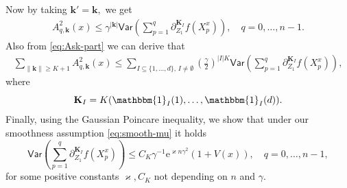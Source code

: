 \documentclass[bj]{imsart}
\def\PVar{\mathsf{Var}}
\def\rme{\mathrm{e}}
\newcommand{\indi}[1]{\mathbbm{1}_{#1}}
\begin{document}
Now by taking $\mathbf{k}'=\mathbf{k},$ we get
\begin{eqnarray*}
A^2_{q,\mathbf{k}}(x)\leq \gamma^{|\mathbf{k}|} \PVar \left( \sum_{p=1}^{q}\partial_{Z_{1}}^{\mathbf{K}_I}f\left(X_{p}^x\right)
\right),\quad q=0,\ldots,n-1.
\end{eqnarray*}
Also from \eqref{eq:Ask-part} we can derive that
\begin{eqnarray*}
\sum_{\|\mathbf{k}\|\geq K+1} A^2_{q,\mathbf{k}}(x)\leq \sum_{I\subseteq\{1,\ldots,d\},\, I\neq \emptyset}
\left(\frac{\gamma}{2}\right)^{|I|K}
\PVar \left( \sum_{p=1}^{q}\partial_{Z_{1}}^{\mathbf{K}_I}f\left(X_{p}^x\right)
\right),
\end{eqnarray*}
where
\[
\mathbf{\mathbf{K}}_{I}=K(\indi{I}(1),\ldots, \indi{I}(d)).
\]
Finally, using the Gaussian Poincare inequality, we show  that under our smoothness assumption \eqref{eq:smooth-mu} it holds
\begin{equation}
\label{eq:varboundV}
\PVar \left(\sum_{p=1}^{q}\partial_{Z_{1}}^{\mathbf{K}_I}f\left(X^x_{p}\right)
\right)\leq C_{K}\gamma^{-1}\rme^{\varkappa n\gamma^2}(1+V(x)),\quad q=0,\ldots,n-1,
\end{equation}
for some positive constants $\varkappa, C_K$ not depending on $n$ and  $\gamma.$
\end{document}
